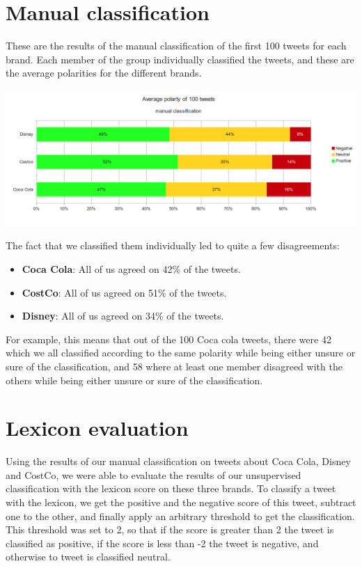\documentclass[a4paper,12pt]{report}
\begin{document}
\section{Manual classification}

These are the results of the manual classification of the first 100 tweets for each brand. Each member of the group individually classified the tweets, and these are the average polarities for the different brands.

\centerline{\includegraphics[scale=0.45]{../img/man1.png}}
\vspace{-0.7cm}

The fact that we classified them individually led to quite a few disagreements:

\begin{itemize}
        \item \textbf{Coca Cola}: All of us agreed on 42\% of the tweets.
        \item \textbf{CostCo}: All of us agreed on 51\% of the tweets.
        \item \textbf{Disney}: All of us agreed on 34\% of the tweets.
\end{itemize}

For example, this means that out of the 100 Coca cola tweets, there were 42 which we all classified according to the same polarity while being either unsure or sure of the classification, and 58 where at least one member disagreed with the others while being either unsure or sure of the classification.

\section{Lexicon evaluation}

Using the results of our manual classification on tweets about Coca Cola, Disney and CostCo, we were able to evaluate the results of our unsupervised classification with the lexicon score on these three brands.
To classify a tweet with the lexicon, we get the positive and the negative score of this tweet, subtract one to the other, and finally apply an arbitrary threshold to get the classification.
This threshold was set to 2, so that if the score is greater than 2 the tweet is classified as positive, if the score is less than -2 the tweet is negative, and otherwise to tweet is classified neutral.
\end{document}
